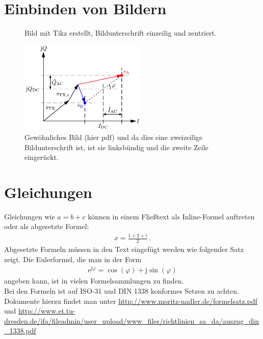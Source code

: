 \section{Einbinden von Bildern}
\label{sec:bilder}

\begin{figure}[!htb]\centering

\caption{Bild mit Tikz erstellt, Bildunterschrift einzeilig und zentriert.}
\label{fig:bild_tikz}
\end{figure}


\begin{figure}[!htb]\centering
\includegraphics*[width = 6cm]{bilder/grundlagen/RX_Basisbandsignal_IQ_Diagramm}
\caption{Gewöhnliches Bild (hier pdf) und da dies eine zweizeilige Bildunterschrift ist, ist sie linksbündig und die zweite Zeile eingerückt.}
\label{fig:normales_bild}
\end{figure}



\section{Gleichungen}
\label{sec:gleichungen}
Gleichungen wie $a=b+c$ können in einem Fließtext als Inline-Formel auftreten oder als abgesetzte Formel:
\begin{align}
	x = \frac{1+2+i}{2} \, .
	\label{eq:gleichung1}
\end{align}
Abgesetzte Formeln müssen in den Text eingefügt werden wie folgender Satz zeigt. Die Eulerformel, die man in der Form
\begin{align}
	\mathrm{e}^{\mathrm{j}\varphi} = \cos(\varphi) + \mathrm{j} \sin(\varphi) 
	\label{eq:gleichung2}
\end{align}
angeben kann, ist in vielen Formelsammlungen zu finden. \\
Bei den Formeln ist auf ISO-31 und DIN 1338 konformes Setzen zu achten. Dokumente hierzu findet man unter \url{http://www.moritz-nadler.de/formelsatz.pdf} und \url{http://www.et.tu-dresden.de/ifa/fileadmin/user_upload/www_files/richtlinien_sa_da/auszug_din_1338.pdf}

